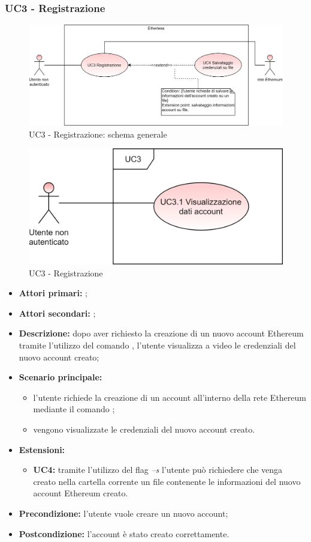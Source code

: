 \subsubsection{UC3 - Registrazione}
\begin{figure}[H]
	\centering
	\includegraphics[scale=\ucs]{./res/img/UC3G.png}
	\caption {UC3 - Registrazione: schema generale}
\end{figure}
\begin{figure}[H]
	\centering
	\includegraphics[scale=\ucs]{./res/img/UC3.png}
	\caption {UC3 - Registrazione}
\end{figure}
\begin{itemize}
	\item \textbf{Attori primari:} \una{};
	\item \textbf{Attori secondari:} \re{};
	\item \textbf{Descrizione:} dopo aver richiesto la creazione di un nuovo account Ethereum tramite l’utilizzo del comando \signup{}, l’utente visualizza a video le credenziali del nuovo account creato; 
	\item \textbf{Scenario principale:}
	\begin{itemize}
		\item l’utente richiede la creazione di un account all’interno della rete Ethereum mediante il comando \signup{};
		\item vengono visualizzate le credenziali del nuovo account creato. 
	\end{itemize}
	\item \textbf{Estensioni:} 
	\begin{itemize}
		\item \textbf{UC4:} tramite l’utilizzo del flag \textit{–s} l’utente può richiedere che venga creato nella cartella corrente un file contenente le informazioni del nuovo account Ethereum creato.
	\end{itemize}
	\item \textbf{Precondizione:} l'utente vuole creare un nuovo account; 
	\item \textbf{Postcondizione:} l’account è stato creato correttamente. 
\end{itemize}